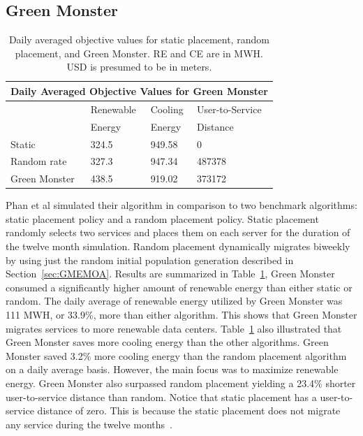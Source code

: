 \documentclass{sig-alternate}
\begin{document}
\subsection{Green Monster}
\label{sec:GM}
\begin{table}[tb]
\begin{center}
\begin{tabular}{|l|l|l|l|}
    \hline
    \multicolumn{4}{|c|}{\textbf{Daily Averaged Objective Values for Green Monster}} \\
    \hline
    & Renewable &  Cooling & User-to-Service \\
    & Energy & Energy & Distance \\
    \hline
    Static & 324.5 & 949.58 & 0 \\
    Random rate & 327.3 & 947.34 & 487378\\
   	Green Monster & 438.5 & 919.02 & 373172\\
    \hline
\end{tabular}
\caption{Daily averaged objective values for static placement, random placement, and Green Monster. RE and CE are in MWH. USD is presumed to be in meters. }
\label{tab:GMV}
\end{center}
\end{table}

Phan et al simulated their algorithm in comparison to two benchmark algorithms: static placement policy and a random placement policy. Static placement randomly selects two services and places them on each server for the duration of the twelve month simulation. Random placement dynamically migrates biweekly by using just the random initial population generation described in Section~\ref{sec:GMEMOA}. Results are summarized in Table~\ref{tab:GMV}, Green Monster consumed a significantly higher amount of renewable energy than either static or random. The daily average of renewable energy utilized by Green Monster was 111 MWH, or 33.9\%, more than either algorithm. This shows that Green Monster migrates services to more renewable data centers.  Table~\ref{tab:GMV} also illustrated that Green Monster saves more cooling energy than the other algorithms. Green Monster saved 3.2\% more cooling energy than the random placement algorithm on a daily average basis. However, the main focus was to maximize renewable energy. Green Monster also surpassed random placement yielding a 23.4\% shorter user-to-service distance than random.  Notice that static placement has a user-to-service distance of zero. This is because the static placement does not migrate any service during the twelve months~\cite{Phan}.   
\end{document}

